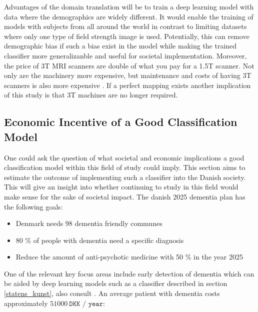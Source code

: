 \documentclass[12pt, fleqn, titlepage]{article}
\newcommand{\1}[1]{\mathds{1}\left[#1\right]}
\begin{document}
Advantages of the domain translation will be to train a deep learning model with data where the demographics are widely different. It would enable the training of models with subjects from all around the world in contrast to limiting datasets where only one type of field strength image is used. Potentially, this can remove demographic bias if such a bias exist in the model while making the trained classifier more generalizanble and useful for societal implementation.  Moreover, the price of 3T MRI scanners are double of what you pay for a 1.5T scanner. Not only are the machinery more expensive, but maintenance and costs of having 3T scanners is also more expensive \cite{kmg}. If a perfect mapping exists another implication of this study is that 3T machines are no longer required.

\subsection{Economic Incentive of a Good Classification Model}

One could ask the question of what societal and economic implications a good classification model within this field of study could imply. This section aims to estimate the outcome of implementing such a classifier into the Danish society. This will give an insight into whether continuing to study in this field would make sense for the sake of societal impact. The danish 2025 dementia plan has the following goals:

\begin{itemize}
	\item Denmark needs 98 dementia friendly communes
	\item 80 \% of people with dementia need a specific diagnosis 
	\item Reduce the amount of anti-psychotic medicine with 50 \% in the year 2025
\end{itemize}
\noindent
One of the relevant key focus areas include early detection of dementia which can be aided by deep learning models such as a classifier described in section \ref{statens_kunst}, also consult \cite{yudong, suk_and_shen_1, suk_and_shen_2, cheng, neuro}. An average patient with dementia costs approximately $ 51000 \ \texttt{DKK / year}$:

		
\end{document}
